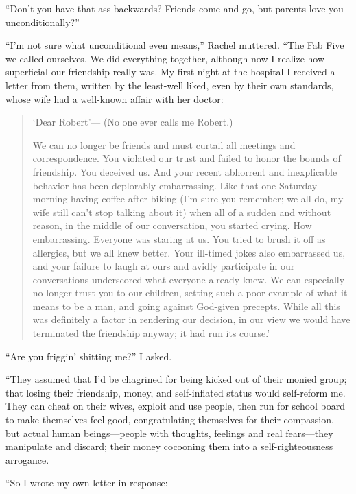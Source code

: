 ``Don't you have that ass-backwards? Friends come and go, but parents
love you unconditionally?''

``I'm not sure what unconditional even means,'' Rachel muttered. ``The
Fab Five we called ourselves. We did everything together, although now I
realize how superficial our friendship really was. My first night at the
hospital I received a letter from them, written by the least-well liked,
even by their own standards, whose wife had a well-known affair with her
doctor:

\begin{quote}
`Dear Robert'--- (No one ever calls me Robert.)

We can no longer be friends and must curtail all meetings and
correspondence. You violated our trust and failed to honor the bounds of
friendship. You deceived us. And your recent abhorrent and inexplicable
behavior has been deplorably embarrassing. Like that one Saturday
morning having coffee after biking (I'm sure you remember; we all do, my
wife still can't stop talking about it) when all of a sudden and without
reason, in the middle of our conversation, you started crying. How
embarrassing. Everyone was staring at us. You tried to brush it off as
allergies, but we all knew better. Your ill-timed jokes also embarrassed
us, and your failure to laugh at ours and avidly participate in our
conversations underscored what everyone already knew. We can especially
no longer trust you to our children, setting such a poor example of what
it means to be a man, and going against God-given precepts. While all
this was definitely a factor in rendering our decision, in our view we
would have terminated the friendship anyway; it had run its course.'
\end{quote}

\noindent ``Are you friggin' shitting me?'' I asked.

``They assumed that I'd be chagrined for being kicked out of their
monied group; that losing their friendship, money, and self-inflated
status would self-reform me. They can cheat on their wives, exploit and
use people, then run for school board to make themselves feel good,
congratulating themselves for their compassion, but actual human
beings---people with thoughts, feelings and real fears---they manipulate
and discard; their money cocooning them into a self-righteousness
arrogance.

``So I wrote my own letter in response:

